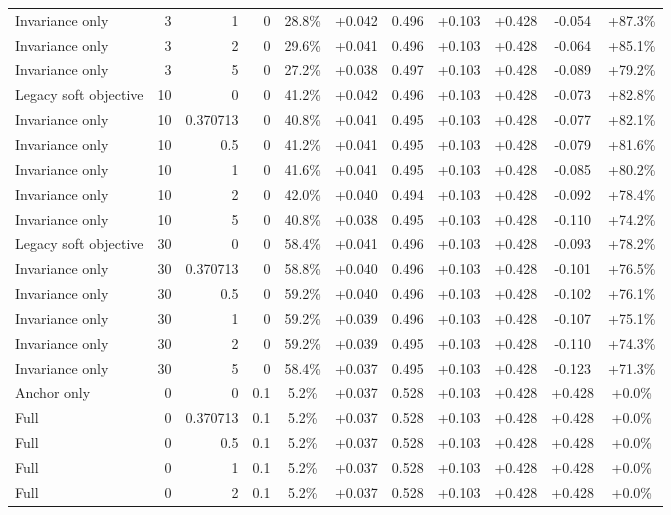 \begin{table}[htbp]
\begin{tabular}{lrrrccccccc}
Invariance only & 3 & 1 & 0 & 28.8\% & +0.042 & 0.496 & +0.103 & +0.428 & -0.054 & +87.3\% \\
Invariance only & 3 & 2 & 0 & 29.6\% & +0.041 & 0.496 & +0.103 & +0.428 & -0.064 & +85.1\% \\
Invariance only & 3 & 5 & 0 & 27.2\% & +0.038 & 0.497 & +0.103 & +0.428 & -0.089 & +79.2\% \\
Legacy soft objective & 10 & 0 & 0 & 41.2\% & +0.042 & 0.496 & +0.103 & +0.428 & -0.073 & +82.8\% \\
Invariance only & 10 & 0.370713 & 0 & 40.8\% & +0.041 & 0.495 & +0.103 & +0.428 & -0.077 & +82.1\% \\
Invariance only & 10 & 0.5 & 0 & 41.2\% & +0.041 & 0.495 & +0.103 & +0.428 & -0.079 & +81.6\% \\
Invariance only & 10 & 1 & 0 & 41.6\% & +0.041 & 0.495 & +0.103 & +0.428 & -0.085 & +80.2\% \\
Invariance only & 10 & 2 & 0 & 42.0\% & +0.040 & 0.494 & +0.103 & +0.428 & -0.092 & +78.4\% \\
Invariance only & 10 & 5 & 0 & 40.8\% & +0.038 & 0.495 & +0.103 & +0.428 & -0.110 & +74.2\% \\
Legacy soft objective & 30 & 0 & 0 & 58.4\% & +0.041 & 0.496 & +0.103 & +0.428 & -0.093 & +78.2\% \\
Invariance only & 30 & 0.370713 & 0 & 58.8\% & +0.040 & 0.496 & +0.103 & +0.428 & -0.101 & +76.5\% \\
Invariance only & 30 & 0.5 & 0 & 59.2\% & +0.040 & 0.496 & +0.103 & +0.428 & -0.102 & +76.1\% \\
Invariance only & 30 & 1 & 0 & 59.2\% & +0.039 & 0.496 & +0.103 & +0.428 & -0.107 & +75.1\% \\
Invariance only & 30 & 2 & 0 & 59.2\% & +0.039 & 0.495 & +0.103 & +0.428 & -0.110 & +74.3\% \\
Invariance only & 30 & 5 & 0 & 58.4\% & +0.037 & 0.495 & +0.103 & +0.428 & -0.123 & +71.3\% \\
Anchor only & 0 & 0 & 0.1 & 5.2\% & +0.037 & 0.528 & +0.103 & +0.428 & +0.428 & +0.0\% \\
Full & 0 & 0.370713 & 0.1 & 5.2\% & +0.037 & 0.528 & +0.103 & +0.428 & +0.428 & +0.0\% \\
Full & 0 & 0.5 & 0.1 & 5.2\% & +0.037 & 0.528 & +0.103 & +0.428 & +0.428 & +0.0\% \\
Full & 0 & 1 & 0.1 & 5.2\% & +0.037 & 0.528 & +0.103 & +0.428 & +0.428 & +0.0\% \\
Full & 0 & 2 & 0.1 & 5.2\% & +0.037 & 0.528 & +0.103 & +0.428 & +0.428 & +0.0\% \\

\end{tabular}
\end{table}
